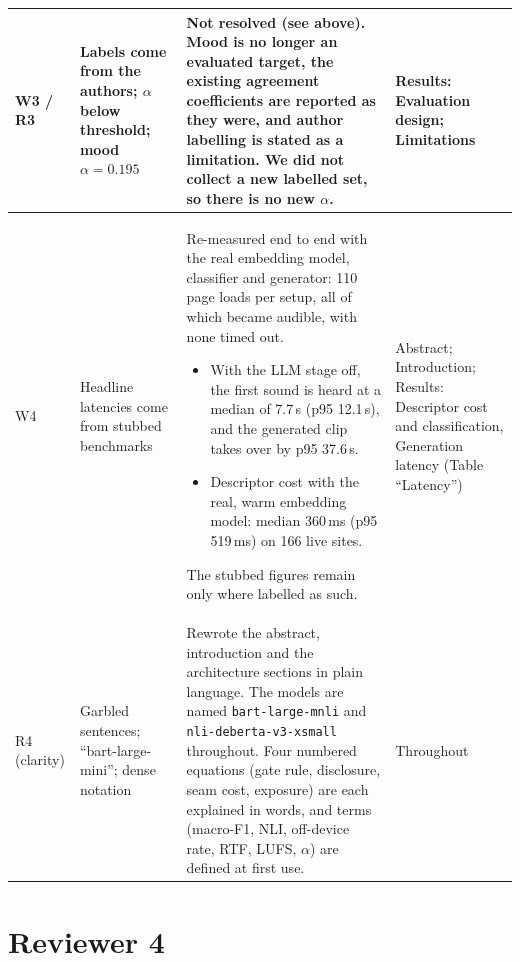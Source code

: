 \documentclass[10pt]{article}
\begin{document}
\begin{xltabular}{\textwidth}{@{}R{1.25cm}R{3.6cm}LR{3.2cm}@{}}
\midrule
W3 / R3 & Labels come from the authors; $\alpha$ below threshold; mood $\alpha = 0.195$ &
Not resolved (see above). Mood is no longer an evaluated target, the existing agreement
coefficients are reported as they were, and author labelling is stated as a limitation. We
did not collect a new labelled set, so there is no new $\alpha$. &
Results: Evaluation design; Limitations \\
\midrule
W4 & Headline latencies come from stubbed benchmarks &
Re-measured end to end with the real embedding model, classifier and generator: 110 page loads
per setup, all of which became audible, with none timed out.
\begin{itemize}
\item With the LLM stage off, the first sound is heard at a median of 7.7\,s (p95 12.1\,s),
  and the generated clip takes over by p95 37.6\,s.
\item Descriptor cost with the real, warm embedding model: median 360\,ms (p95 519\,ms) on 166
  live sites.
\end{itemize}
The stubbed figures remain only where labelled as such. &
Abstract; Introduction; Results: Descriptor cost and classification, Generation latency (Table ``Latency'') \\
\midrule
R4 (clarity) & Garbled sentences; ``bart-large-mini''; dense notation &
Rewrote the abstract, introduction and the architecture sections in plain language. The
models are named \texttt{bart-large-mnli} and \texttt{nli-deberta-v3-xsmall} throughout. Four
numbered equations (gate rule, disclosure, seam cost, exposure) are each explained in words,
and terms (macro-F1, NLI, off-device rate, RTF, LUFS, $\alpha$) are defined at first use. &
Throughout \\
\bottomrule
\end{xltabular}

\section*{Reviewer 4}
\end{document}
